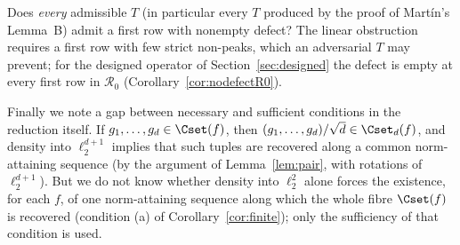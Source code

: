 \begin{problem}\label{prob:universal}
Does \emph{every} admissible $T$ (in particular every $T$ produced by the
proof of Mart\'in's Lemma~B) admit a first row with nonempty defect?  The
linear obstruction requires a first row with few strict non-peaks, which an
adversarial $T$ may prevent; for the designed operator of
Section~\ref{sec:designed} the defect is empty at every first row in
$\mathcal R_0$ (Corollary~\ref{cor:nodefectR0}).
\end{problem}

Finally we note a gap between necessary and sufficient conditions in the
reduction itself.  If $g_1,\dots,g_d\in\Cset(f)$, then
$(g_1,\dots,g_d)/\sqrt d\in\Cset_d(f)$, and density into $\ell_2^{d+1}$
implies that such tuples are recovered along a common norm-attaining
sequence (by the argument of Lemma~\ref{lem:pair}, with rotations of
$\ell_2^{d+1}$).  But we do not
know whether density into $\ell_2^2$ alone forces the existence, for each
$f$, of one norm-attaining sequence along which the whole fibre $\Cset(f)$ is
recovered (condition (a) of Corollary~\ref{cor:finite}); only the
sufficiency of that condition is used.

